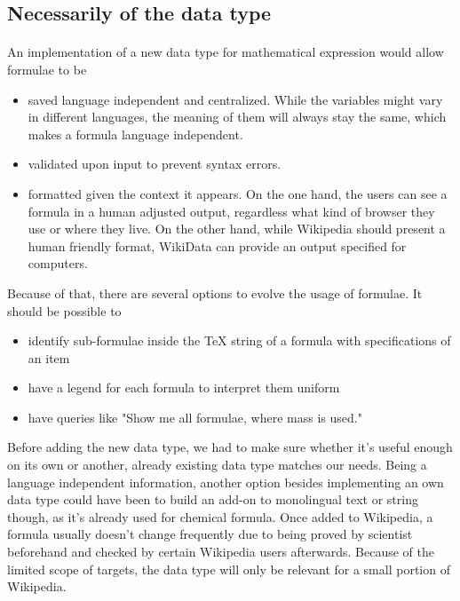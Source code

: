 \documentclass[12pt]{article}
\begin{document}
\subsection{Necessarily of the data type}
\paragraph{}
An implementation of a new data type for mathematical expression would allow formulae to be
\begin{itemize}
\item	saved language independent and centralized. While the variables might vary in different languages, the meaning of them will always stay the same, which makes a formula language independent.

\item	validated upon input to prevent syntax errors.

\item	formatted given the context it appears. On the one hand, the users can see a formula in a human adjusted output, regardless what kind of browser they use or where they live. On the other hand, while Wikipedia should present a human friendly format, WikiData can provide an output specified for computers.
\end{itemize}

Because of that, there are several options to evolve the usage of formulae. It should be possible to

\begin{itemize}
\item	identify sub-formulae inside the TeX string of a formula with specifications of an item 

\item	have a legend for each formula to interpret them uniform

\item	have queries like "Show me all formulae, where mass is used."
\end{itemize}


Before adding the new data type, we had to make sure whether it's useful enough on its own or another, already existing data type matches our needs. 
Being a language independent information, another option besides implementing an own data type could have been to build an add-on to monolingual text or string though, as it's already used for chemical formula.
Once added to Wikipedia, a formula usually doesn't change frequently due to being proved by scientist beforehand and checked by certain Wikipedia users afterwards.
Because of the limited scope of targets, the data type will only be relevant for a small portion of Wikipedia.
\end{document}
